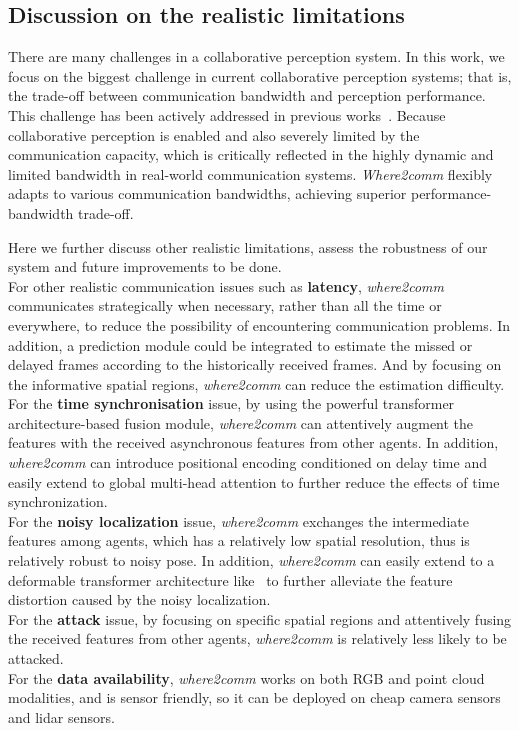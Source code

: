 \documentclass{article}
\begin{document}
\subsection{Discussion on the realistic limitations}
There are many challenges in a collaborative perception system. In this work, we focus on the biggest challenge in current collaborative perception systems; that is, the trade-off between communication bandwidth and perception performance. This challenge has been actively addressed in previous works~\cite{who2com,when2com,v2vnet,disconet}. Because collaborative perception is enabled and also severely limited by the communication capacity, which is critically reflected in the highly dynamic and limited bandwidth in real-world communication systems. \textit{Where2comm} flexibly adapts to various communication bandwidths, achieving superior performance-bandwidth trade-off.


Here we further discuss other realistic limitations, assess the robustness of our system and future improvements to be done. \\
 For other realistic communication issues such as \textbf{latency}, \textit{where2comm} communicates strategically when necessary, rather than all the time or everywhere, to reduce the possibility of encountering communication problems. In addition, a prediction module could be integrated to estimate the missed or delayed frames according to the historically received frames. And by focusing on the informative spatial regions, \textit{where2comm} can reduce the estimation difficulty. \\
 For the \textbf{time synchronisation} issue, by using the powerful transformer architecture-based fusion module, \textit{where2comm} can attentively augment the features with the received asynchronous features from other agents. In addition, \textit{where2comm} can introduce positional encoding conditioned on delay time and easily extend to global multi-head attention to further reduce the effects of time synchronization.\\
 For the \textbf{noisy localization} issue, \textit{where2comm} exchanges the intermediate features among agents, which has a relatively low spatial resolution, thus is relatively robust to noisy pose. In addition, \textit{where2comm} can easily extend to a deformable transformer architecture like~\cite{DeformableDETR} to further alleviate the feature distortion caused by the noisy localization.\\
 For the \textbf{attack} issue, by focusing on specific spatial regions and attentively fusing the received features from other agents, \textit{where2comm} is relatively less likely to be attacked. \\
 For the \textbf{data availability}, \textit{where2comm} works on both RGB and point cloud modalities, and is sensor friendly, so it can be deployed on cheap camera sensors and lidar sensors.
\end{document}
